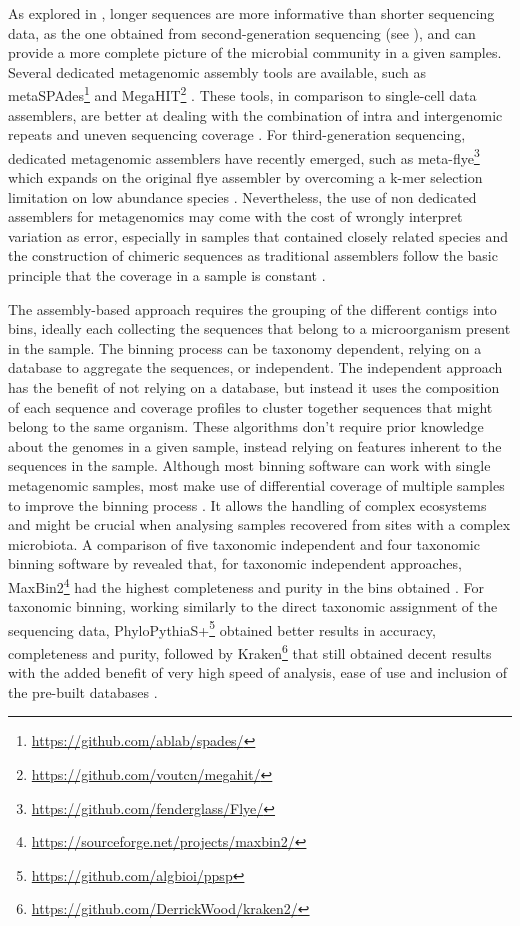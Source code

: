 As explored in , longer sequences are more informative than shorter sequencing data, as the one obtained from second-generation sequencing (see ), and can provide a more complete picture of the microbial community in a given samples. 
Several dedicated metagenomic assembly tools are available, such as metaSPAdes\footnote{\url{https://github.com/ablab/spades/}}  and MegaHIT\footnote{\url{https://github.com/voutcn/megahit/}} \citep{nurk_metaspades_2017, li_megahit_2015}. 
These tools, in comparison to single-cell data assemblers, are better at dealing with the combination of intra and intergenomic repeats and uneven sequencing coverage \citep{olson_metagenomic_2017}.
For third-generation sequencing, dedicated metagenomic assemblers have recently emerged, such as meta-flye\footnote{\url{https://github.com/fenderglass/Flye/}} which expands on the original flye assembler by overcoming a k-mer selection limitation on low abundance species \citep{kolmogorov_metaflye_2020}. Nevertheless, the use of non dedicated assemblers for metagenomics may come with the cost of wrongly interpret variation as error, especially in samples that contained closely related species and the construction of chimeric sequences as traditional assemblers follow the basic principle that the coverage in a sample is constant \citep{teeling_current_2012}. 

The assembly-based approach requires the grouping of the different contigs into bins, ideally each collecting the sequences that belong to a microorganism present in the sample. The binning process can be taxonomy dependent, relying on a database to aggregate the sequences, or independent. The independent approach has the benefit of not relying on a database, but instead it uses the composition of each sequence and coverage profiles to cluster together sequences that might belong to the same organism. These algorithms don’t require prior knowledge about the genomes in a given sample, instead relying on features inherent to the sequences in the sample. Although most binning software can work with single metagenomic samples, most make use of differential coverage of multiple samples to improve the binning process \citep{sedlar_bioinformatics_2017}. It allows the handling of complex ecosystems and might be crucial when analysing samples recovered from sites with a complex microbiota. A comparison of five taxonomic independent  and four taxonomic binning software by \cite{sczyrba_critical_2017} revealed that, for taxonomic independent approaches, MaxBin2\footnote{\url{https://sourceforge.net/projects/maxbin2/}} had the highest completeness and purity in the bins obtained \citep{}. For taxonomic binning, working similarly to the direct taxonomic assignment of the sequencing data, PhyloPythiaS+\footnote{\url{https://github.com/algbioi/ppsp}} obtained better results in accuracy, completeness and purity, followed by Kraken\footnote{\url{https://github.com/DerrickWood/kraken2/}} that still obtained decent results with the added benefit of very high speed of analysis, ease of use and inclusion of the pre-built databases \citep{gregor_phylopythias_2016, wood_kraken_2014}.

 
